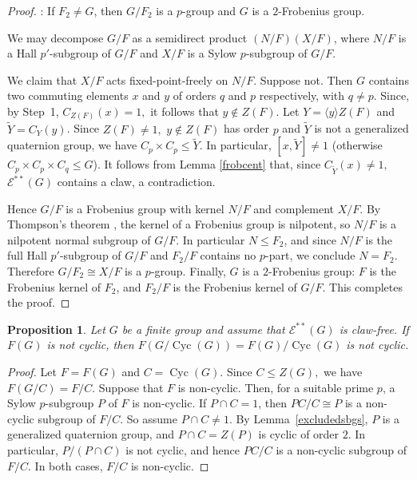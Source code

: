\documentclass[preprint,11pt]{elsarticle}
\newcommand{\cyc}{\operatorname{Cyc}}
\newtheorem{proposition}[theorem]{\bf Proposition}
\begin{document}
\begin{proof}
	\medskip
	: If $F_2 \neq G$, then $G/F_2$ is a 
	$p$-group and $G$ is a $2$-Frobenius group.
	
	We may decompose $G/F$ as a semidirect product $(N/F)(X/F)$, 
	where $N/F$ is a Hall $p'$-subgroup of $G/F$ and $X/F$ is a Sylow 
	$p$-subgroup of $G/F$.
	
	We claim that $X/F$ acts fixed-point-freely on $N/F$. Suppose not. 
	Then $G$ contains two commuting elements $x$ and $y$ of orders $q$ and $p$ respectively,  with
	$q \neq p$. Since, by Step~1, $C_{Z(F)}(x)=1,$ it follows that $y\notin Z(F).$ Let
	$Y=\langle y\rangle Z(F)$ and $\tilde Y=C_Y(y)$. Since $Z(F)\neq 1,$ $y\notin Z(F)$ has order $p$ and $\tilde Y$ is not a generalized quaternion group, we have $C_p\times C_p\leq \tilde Y$.
	In particular,
	$[x,\tilde Y]\neq 1$ (otherwise $C_p\times C_p\times C_q\leq G$). It follows from Lemma \ref{frobcent} that, since  $C_{\tilde Y}(x)\neq 1,$  $\mathcal E^{**}(G)$ contains a claw, a contradiction. 

	Hence $G/F$ is a Frobenius group with kernel $N/F$ and complement $X/F$. 
	By Thompson's theorem \cite[V 8.7 Hauptsatz]{Endliche-gruppen-I-Huppert}, the kernel of a Frobenius group is nilpotent, so 
	$N/F$ is a nilpotent normal subgroup of $G/F$. In particular $N \leq F_2$, 
	and since $N/F$ is the full Hall $p'$-subgroup of $G/F$ and $F_2/F$ 
	contains no $p$-part, we conclude $N = F_2$.
	Therefore $G/F_2 \cong X/F$ is a $p$-group. Finally, $G$ is a 
	$2$-Frobenius group: $F$ is the Frobenius kernel of $F_2$, and $F_2/F$ is 
	the Frobenius kernel of $G/F$.
	This completes the proof.
\end{proof}



\begin{proposition}\label{prop:FH-p-group}
	Let $G$ be a finite group and assume that $\mathcal{E}^{**}(G)$ is claw-free. 
	If $F(G)$ is not cyclic, then $F(G/\cyc(G))=F(G)/\cyc(G)$ is not cyclic.
\end{proposition}

\begin{proof}
	Let $F=F(G)$ and $C=\cyc(G).$ Since $C\leq Z(G),$ we have $F(G/C)=F/C.$
	Suppose that $F$ is non-cyclic. Then, for a suitable prime $p$, a Sylow $p$-subgroup $P$ of $F$ is non-cyclic.
	If $P\cap C=1$, then $PC/C \cong P$ is a non-cyclic subgroup of $F/C.$
	So assume $P\cap C\neq 1.$ By Lemma~\ref{excludedsbgs}, $P$ is a generalized quaternion group, and $P\cap C=Z(P)$ is cyclic of order $2$. In particular, $P/(P\cap C)$ is not cyclic, and hence $PC/C$ is a non-cyclic subgroup of $F/C.$
	In both cases, $F/C$ is non-cyclic.
\end{proof}
\end{document}
